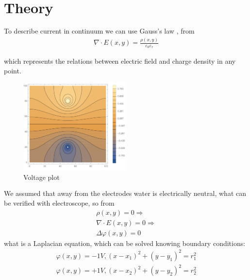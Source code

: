 \documentclass{article}
\begin{document}
\section{Theory}

To describe current in continuum we can use Gauss's law \cite{gauss}, \cite{landavshic} 
from \begin{equation}
  \begin{aligned}
  \nabla\cdot E (x, y) = \frac{\rho (x, y)}{\varepsilon_0 \varepsilon_r}
  \end{aligned}
\end{equation}
	  
   which represents the relations between electric field and charge density in any point.\par

\begin{figure}[h]
    \centering
    \includegraphics[width=0.5\textwidth]{theory plot.pdf}
    \caption{Voltage plot}
    \label{fig:mesh3}
\end{figure}

We assumed that away from the electrodes water is electrically neutral, what can be verified with electroscope, so from \begin{equation}
  \begin{aligned}
    \rho (x, y) = 0 \Rightarrow\\
  	\nabla \cdot E (x, y) = 0 \Rightarrow \\
    \Delta \varphi (x, y) = 0 
  \end{aligned}
\end{equation}
 what is a Laplacian equation, which can be solved knowing boundary conditions:
\begin{equation}
  \begin{aligned}
    \varphi (x, y) = -1 V, (x - x_1)^2 + (y - y_1)^2 = r_1^2 \\
    \varphi (x, y) = +1 V, (x - x_2)^2 + (y - y_2)^2 = r_2^2
  \end{aligned}
\end{equation}
\end{document}
